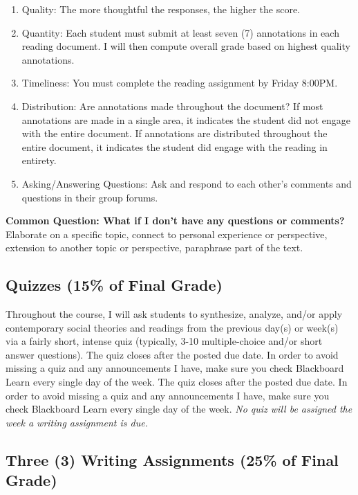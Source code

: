 \documentclass[11pt,]{article}
\providecommand{\tightlist}{%
  \setlength{\itemsep}{0pt}\setlength{\parskip}{0pt}}
\begin{document}
\begin{enumerate}
\def\labelenumi{\arabic{enumi}.}
\tightlist
\item
  Quality: The more thoughtful the responses, the higher the score.
\item
  Quantity: Each student must submit at least seven (7) annotations in
  each reading document. I will then compute overall grade based on
  highest quality annotations.
\item
  Timeliness: You must complete the reading assignment by Friday 8:00PM.
\item
  Distribution: Are annotations made throughout the document? If most
  annotations are made in a single area, it indicates the student did
  not engage with the entire document. If annotations are distributed
  throughout the entire document, it indicates the student did engage
  with the reading in entirety.
\item
  Asking/Answering Questions: Ask and respond to each other's comments
  and questions in their group forums.
\end{enumerate}

\textbf{Common Question: What if I don't have any questions or
comments?} Elaborate on a specific topic, connect to personal experience
or perspective, extension to another topic or perspective, paraphrase
part of the text.

\hypertarget{quizzes-15-of-final-grade}{%
\subsection{Quizzes (15\% of Final
Grade)}\label{quizzes-15-of-final-grade}}

Throughout the course, I will ask students to synthesize, analyze,
and/or apply contemporary social theories and readings from the previous
day(s) or week(s) via a fairly short, intense quiz (typically, 3-10
multiple-choice and/or short answer questions). The quiz closes after
the posted due date. In order to avoid missing a quiz and any
announcements I have, make sure you check Blackboard Learn every single
day of the week. The quiz closes after the posted due date. In order to
avoid missing a quiz and any announcements I have, make sure you check
Blackboard Learn every single day of the week. \emph{No quiz will be
assigned the week a writing assignment is due.}

\hypertarget{writing_assignments}{%
\subsection{Three (3) Writing Assignments (25\% of Final
Grade)}\label{writing_assignments}}
\end{document}
